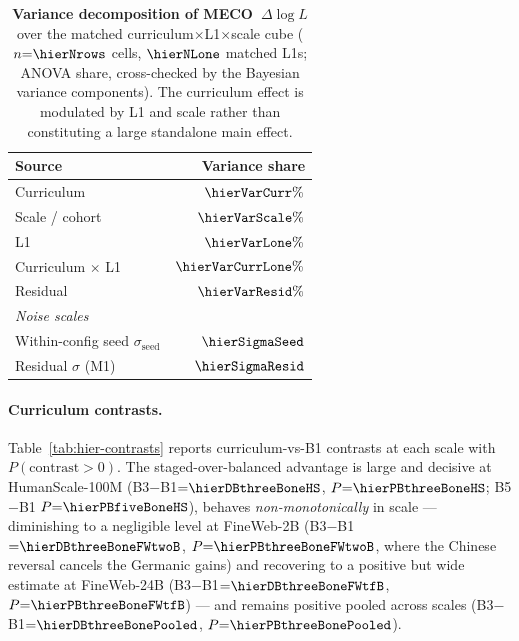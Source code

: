 \begin{table}[ht]
  \centering \small
  \setlength{\tabcolsep}{5pt}
  \caption{\textbf{Variance decomposition of MECO~$\Delta\log L$} over the matched curriculum$\times$L1$\times$scale cube ($n{=}\hierNrows$ cells, $\hierNLone$ matched L1s; ANOVA share, cross-checked by the Bayesian variance components). The curriculum effect is modulated by L1 and scale rather than constituting a large standalone main effect.}
  \label{tab:hier-varcomp}
  \begin{tabular}{lr}
    \toprule
    Source & Variance share \\
    \midrule
    Curriculum                 & $\hierVarCurr\%$ \\
    Scale / cohort             & $\hierVarScale\%$ \\
    L1                         & $\hierVarLone\%$ \\
    Curriculum $\times$ L1     & $\hierVarCurrLone\%$ \\
    Residual                   & $\hierVarResid\%$ \\
    \midrule
    \multicolumn{2}{l}{\textit{Noise scales}} \\
    Within-config seed $\sigma_{\mathrm{seed}}$ & $\hierSigmaSeed$ \\
    Residual $\sigma$ (M1)     & $\hierSigmaResid$ \\
    \bottomrule
  \end{tabular}
\end{table}
 
\paragraph{Curriculum contrasts.} Table~\ref{tab:hier-contrasts} reports curriculum-vs-B1 contrasts at each scale with $P(\text{contrast}{>}0)$. The staged-over-balanced advantage is large and decisive at HumanScale-100M (B3$-$B1${=}\hierDBthreeBoneHS$, $P{=}\hierPBthreeBoneHS$; B5$-$B1 $P{=}\hierPBfiveBoneHS$), behaves \emph{non-monotonically} in scale --- diminishing to a negligible level at FineWeb-2B (B3$-$B1${=}\hierDBthreeBoneFWtwoB$, $P{=}\hierPBthreeBoneFWtwoB$, where the Chinese reversal cancels the Germanic gains) and recovering to a positive but wide estimate at FineWeb-24B (B3$-$B1${=}\hierDBthreeBoneFWtfB$, $P{=}\hierPBthreeBoneFWtfB$) --- and remains positive pooled across scales (B3$-$B1${=}\hierDBthreeBonePooled$, $P{=}\hierPBthreeBonePooled$).
 
